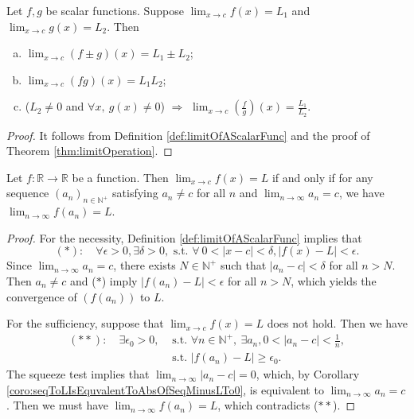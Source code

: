 \begin{thm}
  \label{thm:funcLimitOperation}
  Let $f,g$ be scalar functions.
  Suppose $\lim_{x\rightarrow c}f(x)=L_{1}$ and
  $\lim_{x\rightarrow c}g(x)=L_{2}$. Then
  \begin{enumerate}[(a)]
  \item $\lim_{x\rightarrow c}(f\pm g)(x)=L_{1}\pm L_{2}$;
  \item $\lim_{x\rightarrow c}(fg)(x)=L_{1}L_{2}$;
  \item ($L_{2}\neq 0$ and $\forall x,\ g(x)\neq 0$)
    $\Rightarrow$
    $\lim_{x\rightarrow c}(\frac{f}{g})(x)=\frac{L_{1}}{L_{2}}$.
  \end{enumerate}
\end{thm}
\begin{proof}
  It follows from Definition \ref{def:limitOfAScalarFunc}
  and the proof of Theorem \ref{thm:limitOperation}.
\end{proof}

\begin{thm}
  \label{thm:FuncLimitToSeqLimit}
  Let $f:\mathbb{R}\rightarrow \mathbb{R}$ be a function.
  Then $\lim_{x\rightarrow c}f(x)=L$ if and only if
  for any sequence $(a_{n})_{n\in \mathbb{N}^{+}}$ satisfying
  $a_{n}\neq c$ for all $n$ and
  $\lim_{n\rightarrow\infty}a_{n}=c$, we have
  $\lim_{n\rightarrow \infty}f(a_{n})=L$.
\end{thm}
\begin{proof}
  For the necessity, Definition \ref{def:limitOfAScalarFunc}
  implies that
  \begin{displaymath}
    (*):\quad
    \forall \epsilon>0, \exists \delta>0,\text{ s.t. }
    \forall\ 0<|x-c|<\delta, |f(x)-L|<\epsilon.
  \end{displaymath}
  Since $\lim_{n\rightarrow\infty}a_{n}=c$, there exists $N\in \mathbb{N}^{+}$
  such that $|a_{n}-c|<\delta$ for all $n>N$. Then $a_{n}\neq c$ and
  ($\ast$) imply $|f(a_{n})-L|<\epsilon$ for all $n>N$, which yields
  the convergence of $(f(a_{n}))$ to $L$.

  For the sufficiency, suppose that $\lim_{x\rightarrow c}f(x)=L$
  does not hold. Then we have
  \begin{align*}
    (**): \quad
    \exists \epsilon_{0}>0,&\text{ s.t. }
    \forall n\in \mathbb{N}^{+},\ \exists a_{n}, 0<|a_{n}-c|<\frac{1}{n},\\
    &\text{ s.t. } |f(a_{n})-L|\ge \epsilon_{0}.
  \end{align*}
  The squeeze test implies that
  $\lim_{n\rightarrow\infty}|a_{n}-c|=0$, which,
  by Corollary
  \ref{coro:seqToLIsEquvalentToAbsOfSeqMinusLTo0},
  is equivalent to
  $\lim_{n\rightarrow\infty}a_{n}=c$.
  Then we must have
  $\lim_{n\rightarrow\infty}f(a_{n})=L$,
  which contradicts ($\ast\ast$).
\end{proof}

